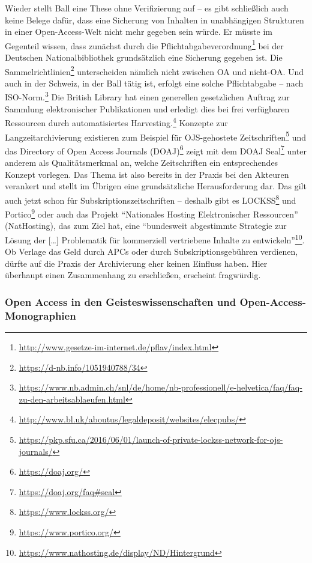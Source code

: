 \documentclass[a4paper,
fontsize=11pt,
oneside,
numbers=noperiodatend,
parskip=half-,
bibliography=totoc,
final
]{scrartcl}
\begin{document}
Wieder stellt Ball eine These ohne Verifizierung auf -- es gibt
schließlich auch keine Belege dafür, dass eine Sicherung von Inhalten in
unabhängigen Strukturen in einer Open-Access-Welt nicht mehr gegeben
sein würde. Er müsste im Gegenteil wissen, dass zunächst durch die
Pflichtabgabeverordnung\footnote{\url{http://www.gesetze-im-internet.de/pflav/index.html}}
bei der Deutschen Nationalbibliothek grundsätzlich eine Sicherung
gegeben ist. Die Sammelrichtlinien\footnote{\url{https://d-nb.info/1051940788/34}}
unterscheiden nämlich nicht zwischen OA und nicht-OA. Und auch in der
Schweiz, in der Ball tätig ist, erfolgt eine solche Pflichtabgabe --
nach ISO-Norm.\footnote{\url{https://www.nb.admin.ch/snl/de/home/nb-professionell/e-helvetica/faq/faq-zu-den-arbeitsablaeufen.html}}
Die British Library hat einen generellen gesetzlichen Auftrag zur
Sammlung elektronischer Publikationen und erledigt dies bei frei
verfügbaren Ressourcen durch automatisiertes Harvesting.\footnote{\url{http://www.bl.uk/aboutus/legaldeposit/websites/elecpubs/}}
Konzepte zur Langzeitarchivierung existieren zum Beispiel für
OJS-gehostete Zeitschriften\footnote{\url{https://pkp.sfu.ca/2016/06/01/launch-of-private-lockss-network-for-ojs-journals/}}
und das Directory of Open Access Journals (DOAJ)\footnote{\url{https://doaj.org/}}
zeigt mit dem DOAJ Seal\footnote{\url{https://doaj.org/faq\#seal}} unter
anderem als Qualitätsmerkmal an, welche Zeitschriften ein entsprechendes
Konzept vorlegen. Das Thema ist also bereits in der Praxis bei den
Akteuren verankert und stellt im Übrigen eine grundsätzliche
Herausforderung dar. Das gilt auch jetzt schon für
Subskriptionszeitschriften -- deshalb gibt es LOCKSS\footnote{\url{https://www.lockss.org/}}
und Portico\footnote{\url{https://www.portico.org/}} oder auch das
Projekt \enquote{Nationales Hosting Elektronischer Ressourcen}
(NatHosting), das zum Ziel hat, eine \enquote{bundesweit abgestimmte
Strategie zur Lösung der {[}\ldots{}{]} Problematik für kommerziell
vertriebene Inhalte zu entwickeln}\footnote{\url{https://www.nathosting.de/display/ND/Hintergrund}}.
Ob Verlage das Geld durch APCs oder durch Subskriptionsgebühren
verdienen, dürfte auf die Praxis der Archivierung eher keinen Einfluss
haben. Hier überhaupt einen Zusammenhang zu erschließen, erscheint
fragwürdig.

\hypertarget{open-access-in-den-geisteswissenschaften-und-open-access-monographien}{%
\subsubsection{Open Access in den Geisteswissenschaften und
Open-Access-Monographien}\label{open-access-in-den-geisteswissenschaften-und-open-access-monographien}}
\end{document}
